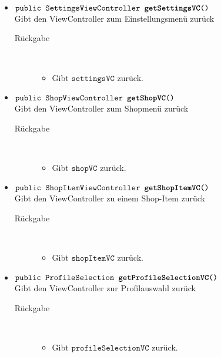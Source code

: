 \begin{description}
\begin{itemize}
		\item $\texttt{public SettingsViewController \textbf{getSettingsVC}()}$ \\ Gibt den ViewController zum Einstellungsmenü zurück
		\begin{description}
			\item[Rückgabe] \hfill \\
			\vspace{-.8cm}
			\begin{itemize}
				\item Gibt $\texttt{settingsVC}$ zurück.
			\end{itemize}
			\end{description}
			
		\item $\texttt{public ShopViewController \textbf{getShopVC}()}$ \\ Gibt den ViewController zum Shopmenü zurück
		\begin{description}
			\item[Rückgabe] \hfill \\
			\vspace{-.8cm}
			\begin{itemize}
				\item Gibt $\texttt{shopVC}$ zurück.
			\end{itemize}
			\end{description}
			
		\item $\texttt{public ShopItemViewController \textbf{getShopItemVC}()}$ \\ Gibt den ViewController zu einem Shop-Item zurück
			\begin{description}
			\item[Rückgabe] \hfill \\
			\vspace{-.8cm}
			\begin{itemize}
				\item Gibt $\texttt{shopItemVC}$ zurück.
			\end{itemize}
		\end{description}
			
		\item $\texttt{public ProfileSelection \textbf{getProfileSelectionVC}()}$ \\ Gibt den ViewController zur Profilauswahl zurück
			\begin{description}
			\item[Rückgabe] \hfill \\
			\vspace{-.8cm}
			\begin{itemize}
				\item Gibt $\texttt{profileSelectionVC}$ zurück.
			\end{itemize}
		\end{description}
		

\end{itemize}
\end{description}
